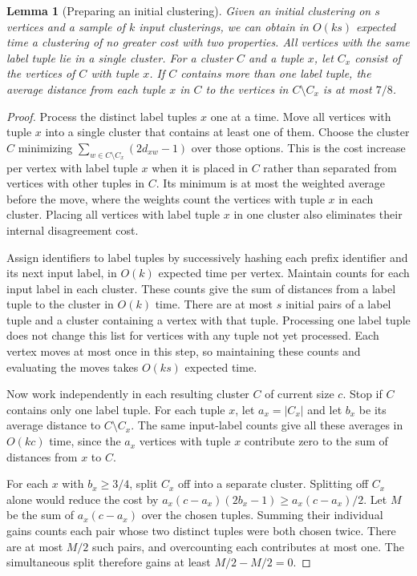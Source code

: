 \documentclass[11pt]{article}
\newtheorem{lemma}[theorem]{Lemma}
\begin{document}
\begin{lemma}[Preparing an initial clustering]
\label{sig:prepare}
Given an initial clustering on $s$ vertices and a sample of $k$ input clusterings, we can obtain
in $O(ks)$ expected time a clustering of no greater cost with two
properties. All vertices with the same label tuple lie in a single
cluster. For a cluster $C$ and a tuple $x$, let $C_x$ consist of the
vertices of $C$ with tuple $x$. If $C$ contains more than one label
tuple, the average distance from each tuple $x$ in $C$ to the
vertices in $C\setminus C_x$ is at most $7/8$.
\end{lemma}
\begin{proof}
Process the distinct label tuples $x$ one at a time. Move all vertices with tuple $x$
into a single cluster that contains
at least one of them. Choose the cluster $C$
minimizing $\sum_{w\in C\setminus C_x}(2d_{xw}-1)$ over those options.
This is the cost increase per vertex with label tuple $x$ when it
is placed in $C$ rather than separated from vertices with other tuples
in $C$. Its minimum is at most the
weighted average before the move, where the weights count the vertices with tuple
$x$ in each cluster. Placing all vertices with label tuple $x$ in one cluster also eliminates their
internal disagreement cost.

Assign identifiers to label tuples by successively hashing each prefix identifier
and its next input label, in $O(k)$ expected time per vertex.
Maintain counts for each input label in each cluster. These counts give
the sum of distances from a label tuple to the cluster in $O(k)$ time.
There are at most $s$ initial pairs of a label tuple and a cluster containing a vertex with that tuple.
Processing one label tuple does not change this list for vertices with any tuple not yet processed.
Each vertex moves at most once in this step, so maintaining these counts
and evaluating the moves takes $O(ks)$ expected time.

Now work independently in each resulting cluster $C$ of current size
$c$. Stop if $C$ contains only one label tuple. For each tuple $x$, let
$a_x=|C_x|$ and let $b_x$ be its average distance to $C\setminus C_x$.
The same input-label counts give all these averages in $O(kc)$ time,
since the $a_x$ vertices with tuple $x$ contribute zero to the sum of distances
from $x$ to $C$.

For each $x$ with $b_x\ge3/4$, split $C_x$ off into a separate cluster. Splitting
off $C_x$ alone would reduce the cost by
$a_x(c-a_x)(2b_x-1)\ge a_x(c-a_x)/2$. Let $M$ be the sum of
$a_x(c-a_x)$ over the chosen tuples. Summing their individual gains
counts each pair whose two distinct tuples were both chosen twice.
There are at most $M/2$ such pairs, and overcounting each contributes
at most one. The simultaneous split therefore gains at least
$M/2-M/2=0$.


\end{proof}
\end{document}
